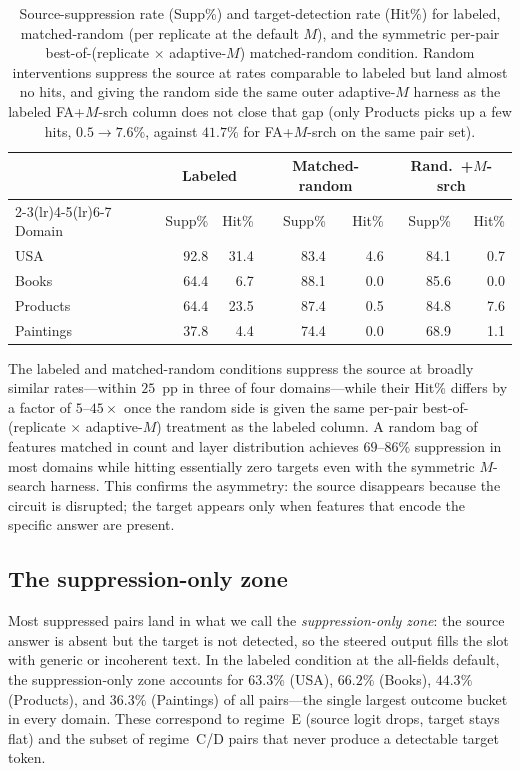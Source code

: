 \begin{table}[h]
\centering\small
\begin{tabular}{lrrrrrr}
\toprule
 & \multicolumn{2}{c}{Labeled} & \multicolumn{2}{c}{Matched-random} & \multicolumn{2}{c}{Rand.\ +$M$-srch} \\
\cmidrule(lr){2-3}\cmidrule(lr){4-5}\cmidrule(lr){6-7}
Domain & Supp\% & Hit\% & Supp\% & Hit\% & Supp\% & Hit\% \\
\midrule
USA      & 92.8 & 31.4 & 83.4 & 4.6 & 84.1 & 0.7 \\
Books    & 64.4 &  6.7 & 88.1 & 0.0 & 85.6 & 0.0 \\
Products & 64.4 & 23.5 & 87.4 & 0.5 & 84.8 & 7.6 \\
Paintings & 37.8 & 4.4 & 74.4 & 0.0 & 68.9 & 1.1 \\
\bottomrule
\end{tabular}
\caption{Source-suppression rate (Supp\%) and target-detection rate (Hit\%) for labeled, matched-random (per replicate at the default $M$), and the symmetric per-pair best-of-(replicate $\times$ adaptive-$M$) matched-random condition. Random interventions suppress the source at rates comparable to labeled but land almost no hits, and giving the random side the same outer adaptive-$M$ harness as the labeled FA+$M$-srch column does not close that gap (only Products picks up a few hits, $0.5\rightarrow7.6\%$, against $41.7\%$ for FA+$M$-srch on the same pair set).}
\label{tab:supp-vs-hit}
\end{table}

The labeled and matched-random conditions suppress the source at broadly similar rates---within $25$~pp in three of four domains---while their Hit\% differs by a factor of $5$--$45\times$ once the random side is given the same per-pair best-of-(replicate $\times$ adaptive-$M$) treatment as the labeled column. A random bag of features matched in count and layer distribution achieves $69$--$86\%$ suppression in most domains while hitting essentially zero targets even with the symmetric $M$-search harness. This confirms the asymmetry: the source disappears because the circuit is disrupted; the target appears only when features that encode the specific answer are present.

\subsection{The suppression-only zone}

Most suppressed pairs land in what we call the \emph{suppression-only zone}: the source answer is absent but the target is not detected, so the steered output fills the slot with generic or incoherent text. In the labeled condition at the all-fields default, the suppression-only zone accounts for $63.3\%$ (USA), $66.2\%$ (Books), $44.3\%$ (Products), and $36.3\%$ (Paintings) of all pairs---the single largest outcome bucket in every domain. These correspond to regime~E (source logit drops, target stays flat) and the subset of regime~C/D pairs that never produce a detectable target token.


